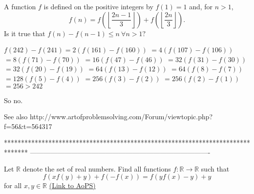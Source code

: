 \begin{solution}
	\begin{tcolorbox}A function $f$ is defined on the positive integers by $f(1)=1$ and, for $n>1$, \[f(n)=f\left(\left\lfloor \frac{2n-1}{3}\right\rfloor\right)+f\left(\left\lfloor \frac{2n}{3}\right\rfloor\right).\] Is it true that $f(n)-f(n-1)\le n\ \forall n>1?$\end{tcolorbox}
$f(242)-f(241)=2(f(161)-f(160))$
$=4(f(107)-f(106))$
$=8(f(71)-f(70))$
$=16(f(47)-f(46))$
$=32(f(31)-f(30))$
$=32(f(20)-f(19))$
$=64(f(13)-f(12))$
$=64(f(8)-f(7))$
$=128(f(5)-f(4))$
$=256(f(3)-f(2))$
$=256(f(2)-f(1))$
$=256>242$

So no.

See also http://www.artofproblemsolving.com/Forum/viewtopic.php?f=56&t=564317
\end{solution}
*******************************************************************************
-------------------------------------------------------------------------------

\begin{problem}
	Let $\mathbb{R}$ denote the set of real numbers. Find all functions $f:\mathbb{R}\rightarrow\mathbb{R}$ such that 
\[f(xf(y)+y)+f(-f(x))=f(yf(x)-y)+y\]
for all $x,y\in\mathbb{R}$
	\flushright \href{https://artofproblemsolving.com/community/c6h569071}{(Link to AoPS)}
\end{problem}



